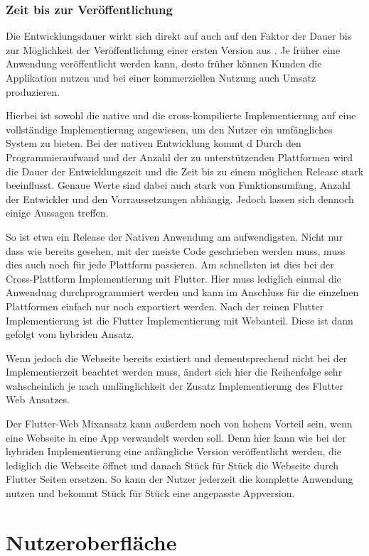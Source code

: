 \subsubsection{Zeit bis zur Veröffentlichung}
Die Entwicklungsdauer wirkt sich direkt auf auch auf den Faktor der Dauer bis zur Möglichkeit der Veröffentlichung einer ersten Version aus .
Je früher eine Anwendung veröffentlicht werden kann, desto früher können Kunden die Applikation nutzen und bei einer kommerziellen Nutzung auch Umsatz produzieren.

Hierbei ist sowohl die native und die cross-kompilierte Implementierung auf eine vollständige Implementierung angewiesen, um den Nutzer ein umfängliches System zu bieten. Bei der nativen Entwicklung kommt d
Durch den Programmieraufwand und der Anzahl der zu unterstützenden Plattformen wird die Dauer der Entwicklungszeit und die Zeit bis zu einem möglichen Release stark beeinflusst. Genaue Werte sind dabei auch stark von Funktionsumfang, Anzahl der Entwickler und den Vorraussetzungen abhängig. Jedoch lassen sich dennoch einige Aussagen treffen.

So ist etwa ein Release der Nativen Anwendung am aufwendigsten. Nicht nur dass wie bereits gesehen, mit der meiste Code geschrieben werden muss, muss dies auch noch für jede Plattform passieren. Am schnellsten ist dies bei der Cross-Plattform Implementierung mit Flutter. Hier muss lediglich einmal die Anwendung durchprogrammiert werden und kann im Anschluss für die einzelnen Plattformen einfach nur noch exportiert werden. Nach der reinen Flutter Implementierung ist die Flutter Implementierung mit Webanteil. Diese ist dann gefolgt vom hybriden Ansatz. 

Wenn jedoch die Webseite bereits existiert und dementsprechend nicht bei der Implementierzeit beachtet werden muss, ändert sich hier die Reihenfolge sehr wahscheinlich je nach umfänglichkeit der Zusatz Implementierung des Flutter Web Ansatzes.

Der Flutter-Web Mixansatz kann außerdem noch von hohem Vorteil sein, wenn eine Webseite in eine App verwandelt werden soll. Denn hier kann wie bei der hybriden Implementierung eine anfängliche Version veröffentlicht werden, die lediglich die Webseite öffnet und danach Stück für Stück die Webseite durch Flutter Seiten ersetzen. So kann der Nutzer jederzeit die komplette Anwendung nutzen und bekommt Stück für Stück eine angepasste Appversion.

\section{Nutzeroberfläche}
